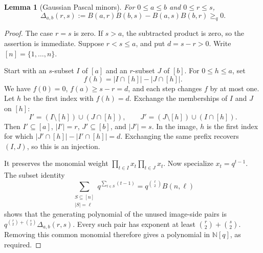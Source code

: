 \documentclass[11pt]{article}
\newcommand{\NN}{\mathbb N}
\newtheorem{lemma}[theorem]{Lemma}
\begin{document}
\begin{lemma}[Gaussian Pascal minors]\label{lem:minor}
For \(0\le a\le b\) and \(0\le r\le s\),
\[
\Delta_{a,b}(r,s):=B(a,r)B(b,s)-B(a,s)B(b,r)\ge_q0.
\]
\end{lemma}
\begin{proof}
The case \(r=s\) is zero. If \(s>a\), the subtracted product is
zero, so the assertion is immediate. Suppose \(r<s\le a\), and put
\(d=s-r>0\). Write \([n]=\{1,\ldots,n\}\).

Start with an \(s\)-subset \(I\) of \([a]\) and an \(r\)-subset
\(J\) of \([b]\). For \(0\le h\le a\), set
\[
f(h)=|I\cap[h]|-|J\cap[h]|.
\]
We have \(f(0)=0\), \(f(a)\ge s-r=d\), and each step changes \(f\)
by at most one. Let \(h\) be the first index with \(f(h)=d\).
Exchange the memberships of \(I\) and \(J\) on \([h]\):
\[
I'=(I\setminus[h])\cup(J\cap[h]),\qquad
J'=(J\setminus[h])\cup(I\cap[h]).
\]
Then \(I'\subseteq[a]\), \(|I'|=r\), \(J'\subseteq[b]\), and
\(|J'|=s\). In the image, \(h\) is the first index for which
\(|J'\cap[h]|-|I'\cap[h]|=d\). Exchanging the same prefix recovers
\((I,J)\), so this is an injection.

It preserves the monomial weight
\(\prod_{t\in I}x_t\prod_{t\in J}x_t\).
Now specialize \(x_t=q^{t-1}\). The subset identity
\[
\sum_{\substack{S\subseteq[n]\\|S|=\ell}}q^{\sum_{t\in S}(t-1)}
=q^{\binom{\ell}{2}}B(n,\ell)
\]
shows that the generating polynomial of the unused image-side pairs is
\(q^{\binom r2+\binom s2}\Delta_{a,b}(r,s)\).
Every such pair has exponent at least \(\binom r2+\binom s2\).
Removing this common monomial therefore gives a polynomial in
\(\NN[q]\), as required.
\end{proof}
\end{document}
